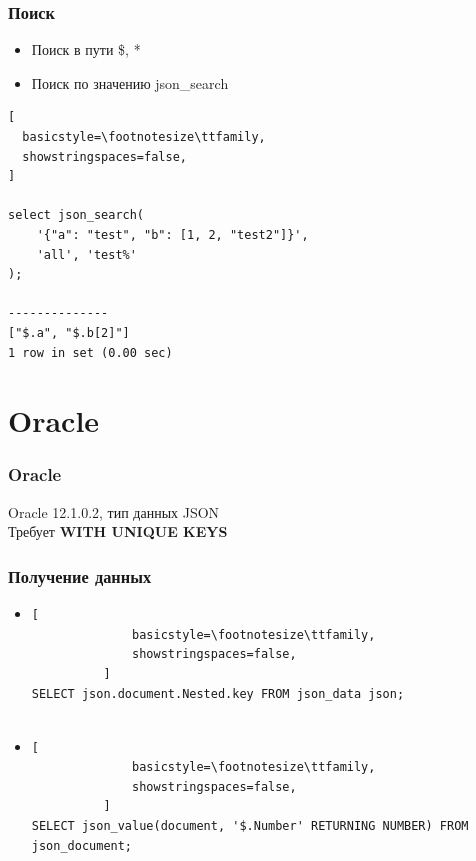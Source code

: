 \documentclass[14pt, compress, aspectratio=169]{beamer}
\begin{document}
\begin{frame}[fragile]
  \frametitle{Поиск}

  \vspace{-20pt}
  \begin{itemize}[label={\MVRightarrow}]
    \item Поиск в пути \$, *
    \item Поиск по значению json\_search
  \end{itemize}

\begin{lstlisting}[
  basicstyle=\footnotesize\ttfamily,
  showstringspaces=false,
]

select json_search(
    '{"a": "test", "b": [1, 2, "test2"]}',
    'all', 'test%'
);

--------------
["$.a", "$.b[2]"]
1 row in set (0.00 sec)

\end{lstlisting}


\end{frame}

\section{Oracle}

\begin{frame}[fragile]
    \frametitle{Oracle}

    Oracle 12.1.0.2, тип данных JSON\\
    Требует \textbf{WITH UNIQUE KEYS}
\end{frame}

\begin{frame}[fragile]
  \frametitle{Получение данных}

  \begin{itemize}
      \item
          \begin{lstlisting}[
              basicstyle=\footnotesize\ttfamily,
              showstringspaces=false,
          ]
SELECT json.document.Nested.key FROM json_data json;
         
          \end{lstlisting}

      \item
          \begin{lstlisting}[
              basicstyle=\footnotesize\ttfamily,
              showstringspaces=false,
          ]
SELECT json_value(document, '$.Number' RETURNING NUMBER) FROM json_document;

         
          \end{lstlisting}

  \end{itemize}

\end{frame}
\end{document}
